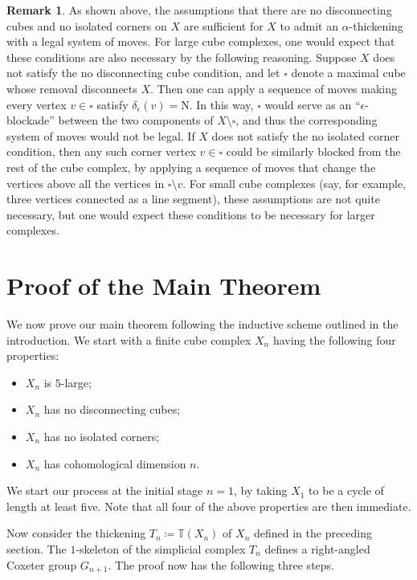 \documentclass[12pt, letterpaper]{article}
\theoremstyle{plain}
\theoremstyle{definition}
\newtheorem{rmk}[thm]{Remark}
\begin{document}
\begin{rmk}
    As shown above, the assumptions that there are no disconnecting cubes and no isolated corners on $X$ are sufficient for $X$ to admit an $\alpha$-thickening with a legal system of moves.
    For large cube complexes, one would expect that these conditions are also necessary by the following reasoning. Suppose $X$ does not satisfy the no disconnecting cube condition, and let $\square$ denote a maximal cube whose removal disconnects $X$. Then one can apply a sequence of moves making every vertex $v \in \square$ satisfy $\delta_{\epsilon}(v) = \text{N}$. In this way, $\square$ would serve as an ``$\epsilon$-blockade'' between the two components of $X \setminus \square$, and thus the corresponding system of moves would not be legal. If $X$ does not satisfy the no isolated corner condition, then any such corner vertex $v \in \square$ could be similarly blocked from the rest of the cube complex, by applying a sequence of moves that change the vertices above all the vertices in $\square \setminus v$.
    For small cube complexes (say, for example, three vertices connected as a line segment), these assumptions are not quite necessary, but one would expect these conditions to be necessary for larger complexes.
\end{rmk}

\section{Proof of the Main Theorem}\label{sec:MainPf}

We now prove our main theorem following the inductive scheme outlined in the introduction. We start with a finite cube complex $X_n$ having the following four properties:
\begin{itemize}
    \item $X_n$ is $5$-large;
    \item $X_n$ has no disconnecting cubes;
    \item $X_n$ has no isolated corners;
    \item $X_n$ has cohomological dimension $n$.
\end{itemize}

\bigskip

We start our process at the initial stage $n=1$, by taking $X_1$ to be a cycle of length at least five. Note that all four of the above properties are then immediate.

Now consider the thickening $T_n\coloneqq \mathbb{T}(X_n)$ of $X_n$ defined in the preceding section. The $1$-skeleton of the simplicial complex $T_n$ defines a right-angled Coxeter group $G_{n+1}$. The proof now has the following three steps.
\end{document}
